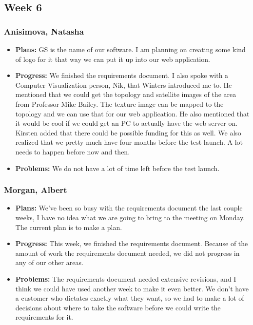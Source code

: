 \documentclass[10pt,draftclsnofoot,onecolumn]{IEEEtran}
\begin{document}
\subsection{Week 6}
\subsubsection{Anisimova, Natasha}
\begin{itemize}
	\item \textbf{Plans: }
	GS is the name of our software. I am planning on creating some kind of logo for it that way we can put it up into our web application.
	\item \textbf{Progress: }
	We finished the requirements document. I also spoke with a Computer Visualization person, Nik, that Winters introduced me to. He mentioned that we could get the topology and satellite images of the area from Professor Mike Bailey. The texture image can be mapped to the topology and we can use that for our web application. He also mentioned that it would be cool if we could get an PC to actually have the web server on. Kirsten added that there could be possible funding for this as well. We also realized that we pretty much have four months before the test launch. A lot needs to happen before now and then.
	\item \textbf{Problems: }
	We do not have a lot of time left before the test launch.
\end{itemize}
\subsubsection{Morgan, Albert}
\begin{itemize}
	\item \textbf{Plans: }
	We've been so busy with the requirements document the last couple weeks, I have no idea what we are going to bring to the meeting on Monday. The current plan is to make a plan.
	\item \textbf{Progress: }
	This week, we finished the requirements document. Because of the amount of work the requirements document needed, we did not progress in any of our other areas.
	\item \textbf{Problems: }
	The requirements document needed extensive revisions, and I think we could have used another week to make it even better. We don't have a customer who dictates exactly what they want, so we had to make a lot of decisions about where to take the software before we could write the requirements for it.
\end{itemize}
\end{document}

